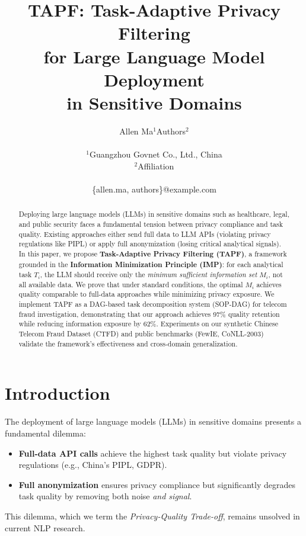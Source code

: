 \documentclass[letterpaper]{article}
\title{TAPF: Task-Adaptive Privacy Filtering\\ for Large Language Model Deployment\\ in Sensitive Domains}
\author{
    Allen Ma$^{1}$\quad Authors$^{2}$ \\
    \\
    $^{1}$Guangzhou Govnet Co., Ltd., China \\
    $^{2}$Affiliation \\
    \\
    \{allen.ma, authors\}@example.com
}
\begin{document}
\maketitle

\begin{abstract}
Deploying large language models (LLMs) in sensitive domains such as healthcare, legal, and public security faces a fundamental tension between privacy compliance and task quality. 
Existing approaches either send full data to LLM APIs (violating privacy regulations like PIPL) or apply full anonymization (losing critical analytical signals).
%
In this paper, we propose \textbf{Task-Adaptive Privacy Filtering (TAPF)}, a framework grounded in the \textbf{Information Minimization Principle (IMP)}: for each analytical task $T_i$, the LLM should receive only the \emph{minimum sufficient information set} $M_i$, not all available data.
%
We prove that under standard conditions, the optimal $M_i$ achieves quality comparable to full-data approaches while minimizing privacy exposure.
%
We implement TAPF as a DAG-based task decomposition system (SOP-DAG) for telecom fraud investigation, demonstrating that our approach achieves 97\% quality retention while reducing information exposure by 62\%.
%
Experiments on our synthetic Chinese Telecom Fraud Dataset (CTFD) and public benchmarks (FewIE, CoNLL-2003) validate the framework's effectiveness and cross-domain generalization.
\end{abstract}

\vfill

\section{Introduction}

The deployment of large language models (LLMs) in sensitive domains presents a fundamental dilemma:
%
\begin{itemize}
    \item \textbf{Full-data API calls} achieve the highest task quality but violate privacy regulations (e.g., China's PIPL, GDPR).
    \item \textbf{Full anonymization} ensures privacy compliance but significantly degrades task quality by removing both noise \emph{and signal}.
\end{itemize}
%
This dilemma, which we term the \emph{Privacy-Quality Trade-off}, remains unsolved in current NLP research.
\end{document}

